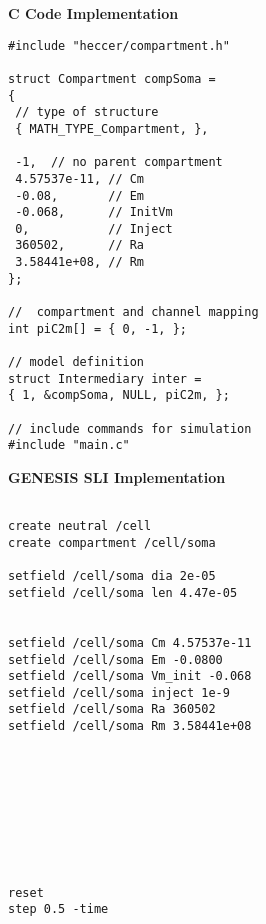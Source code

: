 \documentclass[10pt]{article}
\begin{document}
{ 
\vspace*{1mm} 
\begin{minipage}{1\linewidth}
    
\begin{minipage}[t]{.50\linewidth}
\vspace*{1mm}

{\bf C Code Implementation}
\begin{verbatim}
#include "heccer/compartment.h"

struct Compartment compSoma =
{
 // type of structure
 { MATH_TYPE_Compartment, },

 -1,  // no parent compartment
 4.57537e-11, // Cm
 -0.08,       // Em
 -0.068,      // InitVm
 0,           // Inject
 360502,      // Ra
 3.58441e+08, // Rm
};

//  compartment and channel mapping
int piC2m[] = { 0, -1, };

// model definition
struct Intermediary inter =
{ 1, &compSoma, NULL, piC2m, };

// include commands for simulation
#include "main.c"

\end{verbatim}
\end{minipage}
\vspace*{2mm} 
\begin{minipage}[t]{.50\linewidth}
\vspace*{1mm} 

{\bf GENESIS SLI Implementation}
\begin{verbatim}

create neutral /cell
create compartment /cell/soma

setfield /cell/soma dia 2e-05
setfield /cell/soma len 4.47e-05


setfield /cell/soma Cm 4.57537e-11
setfield /cell/soma Em -0.0800
setfield /cell/soma Vm_init -0.068
setfield /cell/soma inject 1e-9
setfield /cell/soma Ra 360502
setfield /cell/soma Rm 3.58441e+08









reset
step 0.5 -time
\end{verbatim}
    \end{minipage}
  \end{minipage}
    \vspace*{1mm}
}
\end{document}
